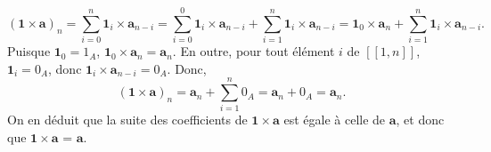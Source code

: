 \begin{itemize}[nosep]
\begin{equation*}
            (\mathbf{1} \times \mathbf{a})_n 
            = \sum_{i=0}^n \mathbf{1}_i \times \mathbf{a}_{n-i}
            = \sum_{i=0}^0 \mathbf{1}_i \times \mathbf{a}_{n-i} + \sum_{i=1}^n \mathbf{1}_i \times \mathbf{a}_{n-i}
            = \mathbf{1}_0 \times \mathbf{a}_n + \sum_{i=1}^n \mathbf{1}_i \times \mathbf{a}_{n-i}.
        \end{equation*}
        Puisque $\mathbf{1}_0 = 1_A$, $\mathbf{1}_0 \times \mathbf{a}_n = \mathbf{a}_n$.
        En outre, pour tout élément $i$ de $[\![1, n]\!]$, $\mathbf{1}_i = 0_A$, donc $\mathbf{1}_i \times \mathbf{a}_{n-i} = 0_A$.
        Donc, 
        \begin{equation*}
            (\mathbf{1} \times \mathbf{a})_n 
            = \mathbf{a}_n + \sum_{i=1}^n 0_A
            = \mathbf{a}_n + 0_A
            = \mathbf{a}_n .
        \end{equation*}
        On en déduit que la suite des coefficients de $\mathbf{1} \times \mathbf{a}$ est égale à celle de $\mathbf{a}$, et donc que $\mathbf{1} \times \mathbf{a}$ = $\mathbf{a}$.
\end{itemize}

\done

